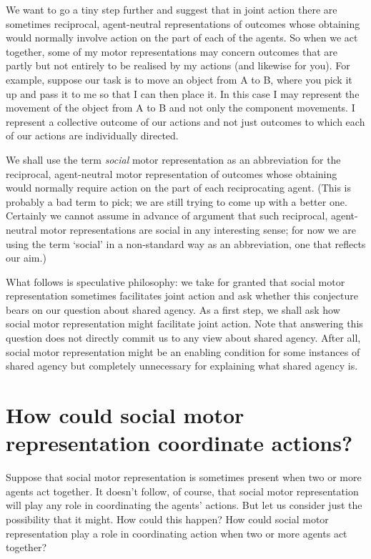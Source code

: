 \documentclass[12pt,\papersize]{extarticle}
\begin{document}
We want to go a tiny step further and suggest that in joint action there are sometimes reciprocal, agent-neutral representations of outcomes whose obtaining would normally involve action on the part of each of the agents.
So when we act together, some of my motor representations may concern outcomes that are partly but not entirely to be realised by my actions (and likewise for you).
For example, suppose our task is to move an object from A to B, where you pick it up and pass it to me so that I can then place it.
In this case I may represent the movement of the object from A to B and not only the component movements.
I represent a collective outcome of our actions and not just outcomes to which each of our actions are individually directed.
%

We shall use the term \emph{social} motor representation as an abbreviation for the reciprocal, agent-neutral motor representation of outcomes whose obtaining would normally require action on the part of each reciprocating agent.
(This is probably a bad term to pick; we are still trying to come up with a better one. 
Certainly we cannot assume in advance of argument that such reciprocal, agent-neutral motor representations are social in any interesting sense;
for now we are using the term `social' in a non-standard way as an abbreviation, one that reflects our aim.)

What follows is speculative philosophy: we take for granted that  social motor representation sometimes facilitates joint action and ask whether this conjecture bears on our question about shared agency.
As a first step, we shall ask how social motor representation might facilitate joint action.
Note that answering this question does not directly commit us to any view about shared agency.
After all, social motor representation might be an enabling condition for some instances of shared agency but completely unnecessary for explaining what shared agency is.


\section{How could social motor representation coordinate actions?}
Suppose that social motor representation is sometimes present when two or more agents act together.
It doesn't follow, of course, that social motor representation will play any role in coordinating the agents' actions.
But let us consider just the possibility that it might.
How could this happen?
How could social motor representation play a role in coordinating action when two or more agents act together?
\end{document}
